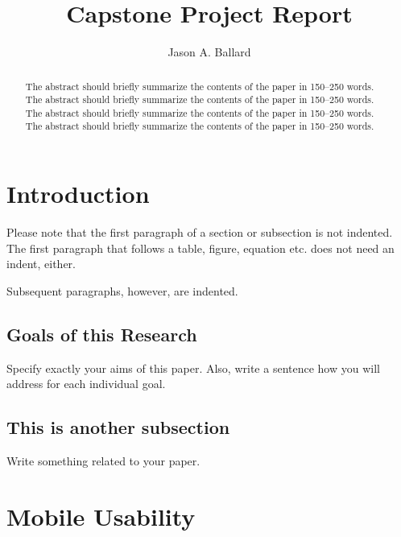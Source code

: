 \documentclass[runningheads]{llncs}
\begin{document}
%
\title{Capstone Project Report}
%
%
\author{Jason A. Ballard}
%
%
%
\maketitle              %
%
\begin{abstract}
The abstract should briefly summarize the contents of the paper in
150--250 words. The abstract should briefly summarize the contents of the paper in
150--250 words. The abstract should briefly summarize the contents of the paper in
150--250 words. The abstract should briefly summarize the contents of the paper in
150--250 words.

\end{abstract}
%
%
%
\section{Introduction}

Please note that the first paragraph of a section or subsection is
not indented. The first paragraph that follows a table, figure,
equation etc. does not need an indent, either.

Subsequent paragraphs, however, are indented.

\subsection{Goals of this Research} 
Specify exactly your aims of this paper. Also, write a sentence how you will address for each individual goal.

\subsection{This is another subsection}
Write something related to your paper.

\section{Mobile Usability}
\end{document}
